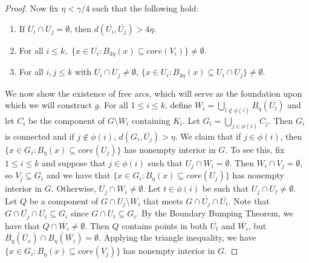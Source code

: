 \documentclass[10pt,a4paper]{amsart}
\numberwithin{equation}{section}
\begin{document}
\begin{proof}
Now fix $\eta <\gamma/4$ such that the following hold: 

\begin{enumerate}
    \item[(1)] If $U_i\cap U_j= \emptyset$, then $d(\overline{U_i},\overline{U_j})> 4\eta$.
    \item[(2)]For all $i\leq k,$ $\{x\in U_i:B_{4\eta}(x)\subseteq core(V_i)\}\neq \emptyset$.
    \item[(3)] For all $i,j\leq k$ with $U_i\cap U_j\neq \emptyset$, $\{x\in U_i:B_{4\eta}(x)\subseteq U_i\cap U_j\} \neq \emptyset$.
\end{enumerate}

We now show the existence of free arcs, which will serve as the foundation upon which we will construct $g$. For all $1\leq i \leq k$, define $W_i= \bigcup_{l\notin \phi(i)} B_\eta(\overline{U_l}) $ and let $C_i$ be the component of $G\setminus W_i$ containing $K_i$. Let  $G_i = \bigcup_{j\in \phi(i)} C_j $. Then $G_i$ is connected and if $j\notin \phi(i)$, $d(G_i,\overline{U_j})>\eta.$ We claim that if $j\in \phi(i)$, then $\{x\in G_i : B_\eta(x)\subseteq core(U_j)\}$ has nonempty interior in $G$. To see this, fix $1\leq i\leq k$ and suppose that $j\in \phi(i)$ such that $U_j\cap W_i=\emptyset$. Then $W_i\cap V_j=\emptyset$, so $V_j\subseteq G_i$ and we have that $\{x\in G_i : B_\eta(x)\subseteq core(U_j)\}$ has nonempty interior in $G$. Otherwise, $U_j\cap W_i\neq \emptyset.$ Let $t\in \phi(i)$ be such that $U_j\cap U_t\neq \emptyset$. Let $Q$ be a component of $G\cap U_j\setminus W_i$ that meets $G\cap \overline{U_j}\cap \overline{U_t}$. Note that $G\cap \overline{U_j}\cap\overline{U_t}\subseteq G_i$ since $G\cap U_t\subseteq G_i$. By the Boundary Bumping Theorem, we have that $Q\cap \overline{W_i}\neq \emptyset$. Then $Q$ contains points in both $\overline{U_t}$ and $\overline{W_i}$, but $B_\eta(\overline{U_s})\cap B_\eta(\overline{W_i})=\emptyset.$ Applying the triangle inequality, we have $\{x\in G_i: B_\eta(x)\subseteq core(V_j)\}$  has nonempty interior in $G$. 


\end{proof}
\end{document}
